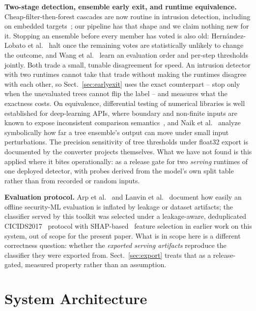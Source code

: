 \documentclass[runningheads]{llncs}
\begin{document}
\textbf{Two-stage detection, ensemble early exit, and runtime equivalence.} Cheap-filter-then-forest cascades are now routine in intrusion detection, including on embedded targets~\cite{ferreira2026canbus}; our pipeline has that shape and we claim nothing new for it. Stopping an ensemble before every member has voted is also old: Hern\'andez-Lobato et al.~\cite{hernandezlobato2009pruning} halt once the remaining votes are statistically unlikely to change the outcome, and Wang et al.~\cite{wang2018qwyc} learn an evaluation order and per-step thresholds jointly. Both trade a small, tunable disagreement for speed. An intrusion detector with two runtimes cannot take that trade without making the runtimes disagree with each other, so Sect.~\ref{sec:earlyexit} uses the exact counterpart -- stop only when the unevaluated trees cannot flip the label -- and measures what the exactness costs. On equivalence, differential testing of numerical libraries is well established for deep-learning APIs, where boundary and non-finite inputs are known to expose inconsistent comparison semantics~\cite{duan2026xamt}, and Naik et al.~\cite{naik2026sensitivity} analyze symbolically how far a tree ensemble's output can move under small input perturbations. The precision sensitivity of tree thresholds under float32 export is documented by the converter projects themselves. What we have not found is this applied where it bites operationally: as a release gate for two \emph{serving} runtimes of one deployed detector, with probes derived from the model's own split table rather than from recorded or random inputs.

\textbf{Evaluation protocol.} Arp et al.~\cite{arp2022dosdonts} and Lanvin et al.~\cite{lanvin2023errors} document how easily an offline security-ML evaluation is inflated by leakage or dataset artifacts; the classifier served by this toolkit was selected under a leakage-aware, deduplicated CICIDS2017~\cite{sharafaldin2018toward} protocol with SHAP-based~\cite{lundberg2017unified} feature selection in earlier work on this system, out of scope for the present paper. What is in scope here is a different correctness question: whether the \emph{exported serving artifacts} reproduce the classifier they were exported from. Sect.~\ref{sec:export} treats that as a release-gated, measured property rather than an assumption.

\section{System Architecture}
\label{sec:arch}
\end{document}
